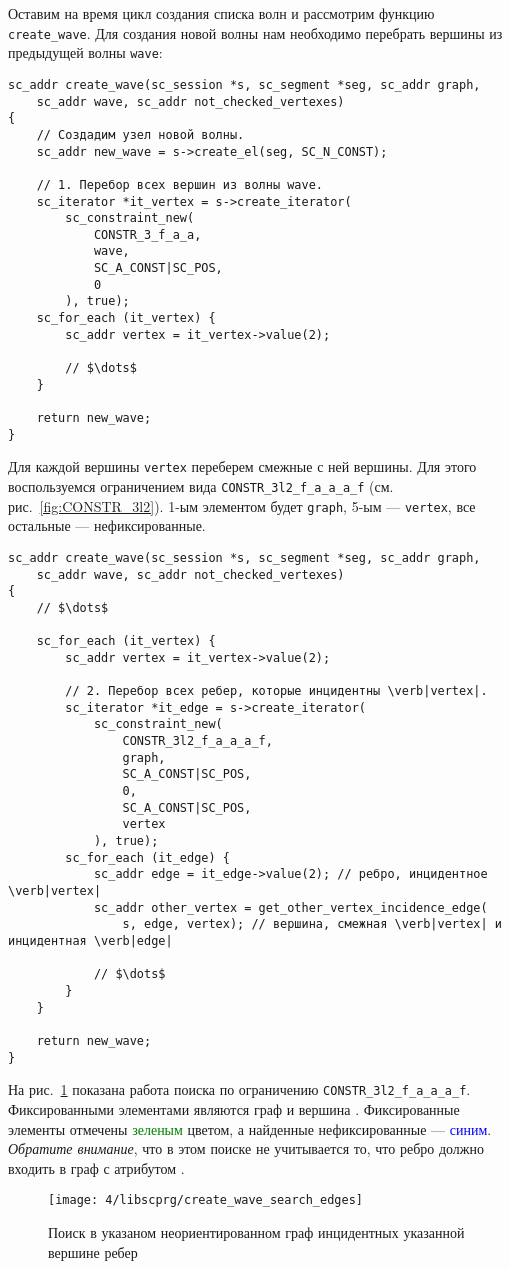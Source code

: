 Оставим на время цикл создания списка волн и рассмотрим функцию
\lstinline|create_wave|. Для создания новой волны нам необходимо
перебрать вершины из предыдущей волны \lstinline|wave|:
\begin{lstlisting}[texcl]
sc_addr create_wave(sc_session *s, sc_segment *seg, sc_addr graph,
    sc_addr wave, sc_addr not_checked_vertexes)
{
    // Создадим узел новой волны.
    sc_addr new_wave = s->create_el(seg, SC_N_CONST);

    // 1. Перебор всех вершин из волны wave.
    sc_iterator *it_vertex = s->create_iterator(
        sc_constraint_new(
            CONSTR_3_f_a_a,
            wave,
            SC_A_CONST|SC_POS,
            0
        ), true);
    sc_for_each (it_vertex) {
        sc_addr vertex = it_vertex->value(2);

        // $\dots$
    }

    return new_wave;
}
\end{lstlisting}

Для каждой вершины \lstinline|vertex| переберем смежные с ней
вершины. Для этого воспользуемся ограничением вида
\lstinline|CONSTR_3l2_f_a_a_a_f| (см. рис.~\ref{fig:CONSTR_3l2}). 1-ым
элементом будет \lstinline|graph|, 5-ым --- \lstinline|vertex|, все
остальные --- нефиксированные.
\begin{lstlisting}[texcl]
sc_addr create_wave(sc_session *s, sc_segment *seg, sc_addr graph,
    sc_addr wave, sc_addr not_checked_vertexes)
{
    // $\dots$

    sc_for_each (it_vertex) {
        sc_addr vertex = it_vertex->value(2);

        // 2. Перебор всех ребер, которые инцидентны \verb|vertex|.
        sc_iterator *it_edge = s->create_iterator(
            sc_constraint_new(
                CONSTR_3l2_f_a_a_a_f,
                graph,
                SC_A_CONST|SC_POS,
                0,
                SC_A_CONST|SC_POS,
                vertex
            ), true);
        sc_for_each (it_edge) {
            sc_addr edge = it_edge->value(2); // ребро, инцидентное  \verb|vertex|
            sc_addr other_vertex = get_other_vertex_incidence_edge(
                s, edge, vertex); // вершина, смежная \verb|vertex| и инцидентная \verb|edge|

            // $\dots$
        }
    }

    return new_wave;
}
\end{lstlisting}

На рис.~\ref{fig:create_wave_search_edges} показана работа поиска по
ограничению \lstinline|CONSTR_3l2_f_a_a_a_f|. Фиксированными
элементами являются граф  и вершина . Фиксированные
элементы отмечены \textcolor{green}{зеленым} цветом, а найденные
нефиксированные --- \textcolor{blue}{синим}. \emph{Обратите внимание},
что в этом поиске не учитывается то, что ребро должно входить в граф с
атрибутом .
\begin{figure}[h!]
  \centering
  \texttt{[image: 4/libscprg/create\_wave\_search\_edges]}
  \caption{Поиск в указаном неориентированном граф инцидентных указанной вершине ребер}
  \label{fig:create_wave_search_edges}
\end{figure}

